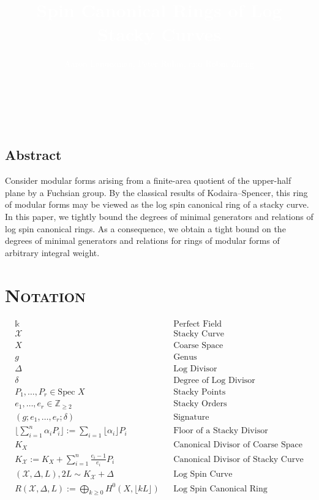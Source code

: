 \documentclass[landscape, a0, largefonts]{sciposter}
\title{\vspace{.5cm} \textcolor{white} {Spin Canonical Rings of Log Stacky Curves}}
\author{\textcolor{white}{Aaron Landesman, Peter Ruhm, and Robin Zhang}}
\institute{\vspace{-.25cm} \textcolor{white}{Harvard University, Stanford University, Stanford University}}
\theoremstyle{plain}
\theoremstyle{definition}
\theoremstyle{remark}
\newcommand\BZ{{\mathbb Z}}
\newcommand\sx{\mathscr X}
\newcommand{\halfcan}{L}
\begin{document}


\\
\\
  \begin{multicols}{3}
	  \begin{tcolorbox}
	  \section*{Abstract}

 	Consider modular forms arising from a finite-area quotient of the
	upper-half plane by a Fuchsian group. By the classical results of
	Kodaira--Spencer, this ring of modular forms may be viewed as the
	log spin canonical ring of a stacky curve. In this paper, we
	tightly bound the degrees of minimal generators and relations of
	log spin canonical rings. As a consequence, we obtain a tight bound
	on the degrees of minimal generators and relations for rings of
	modular forms of arbitrary integral weight.
\end{tcolorbox}

  \section*{\textsc{Notation}}
  \begin{align*}
	  \Bbbk & & \text{Perfect Field} \\
	  \sx & & \text{Stacky Curve} \\
	  X & & \text{Coarse Space} \\
	  g & & \text{Genus} \\
	  \Delta & & \text{Log Divisor} \\
	  \delta & & \text{Degree of Log Divisor} \\
	  P_1, \ldots, P_r \in \text{Spec } X & & \text{Stacky Points} \\
	  e_1, \ldots, e_r \in \BZ_{\geq 2}  & & \text{Stacky Orders} \\
	  (g; e_1,\ldots, e_r; \delta) & & \text{Signature} \\
	\lfloor \sum_{i=1}^n \alpha_i P_i \rfloor := \sum_{i=1} \lfloor \alpha_i\rfloor P_i & & \text{Floor of a Stacky Divisor} \\
	K_X & & \text{Canonical Divisor of Coarse Space} \\
	K_\sx := K_X + \sum_{i=1}^n \frac{e_i-1}{e_i} P_i & & \text{Canonical Divisor of Stacky Curve} \\
	(\sx, \Delta, L), 2L \sim K_\sx + \Delta & & \text{Log Spin Curve} \\
	R(\sx, \Delta, \halfcan) := \bigoplus_{k \geq 0} H^0(X, \lfloor k \halfcan \rfloor) & & \text{Log Spin Canonical Ring}
  \end{align*}


\end{multicols}
\end{document}

